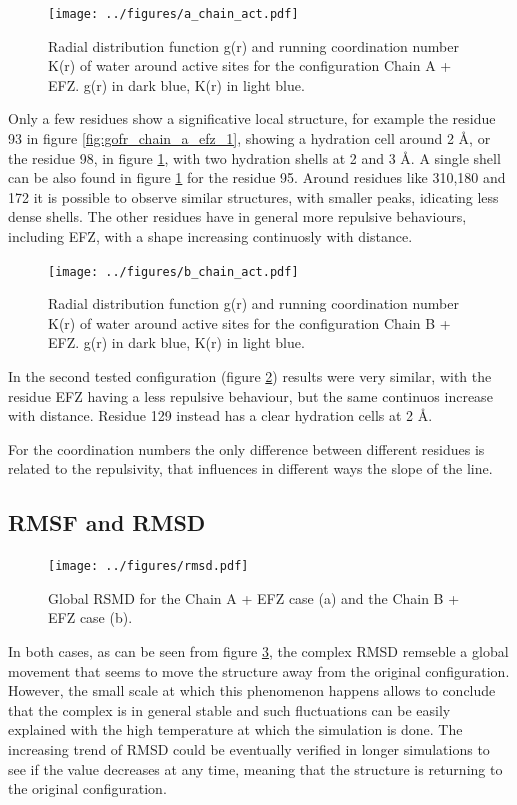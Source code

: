\documentclass[12pt]{article}
\begin{document}
\begin{figure}
    \centering
    \texttt{[image: ../figures/a\_chain\_act.pdf]}
    \caption{Radial distribution function g(r) and running coordination number K(r) of water around active sites for the configuration Chain A + EFZ. g(r) in dark blue, K(r) in light blue.\label{fig:gofr_chain_a_efz_2}}
\end{figure}
Only a few residues show a significative local structure, for example the residue 93 in figure \ref{fig:gofr_chain_a_efz_1}, showing a hydration cell around
2 \AA, or the residue 98, in figure \ref{fig:gofr_chain_a_efz_2}, with two hydration shells at 2 and 3 \AA. A single shell can be also found in figure \ref{fig:gofr_chain_a_efz_2} for the residue 95.
Around residues like 310,180 and 172 it is possible to observe similar structures, with smaller peaks, idicating less dense shells. The other residues have in general more repulsive behaviours, including EFZ, with a shape increasing continuosly with distance.

\begin{figure}[H]
    \centering
    \texttt{[image: ../figures/b\_chain\_act.pdf]}
    \caption{Radial distribution function g(r) and running coordination number K(r) of water around active sites for the configuration Chain B + EFZ. g(r) in dark blue, K(r) in light blue.\label{fig:gofr_chain_b_efz}}
\end{figure}

In the second tested configuration (figure \ref{fig:gofr_chain_b_efz}) results were very similar, with the residue EFZ having a less repulsive behaviour, but the same continuos increase with distance. Residue 129 instead has a clear hydration cells at 2 \AA.

For the coordination numbers the only difference between different residues is related to the repulsivity, that influences in different ways the slope of the line.

\subsection{RMSF and RMSD}
\begin{figure}[H]
    \centering
    \texttt{[image: ../figures/rmsd.pdf]}
    \caption{Global RSMD for the Chain A + EFZ case (a) and the Chain B + EFZ case (b).\label{fig:rmsd}}
\end{figure}
In both cases, as can be seen from figure \ref{fig:rmsd}, the complex RMSD remseble a global movement that seems to move the structure away from the original configuration. However, the small scale at which this phenomenon happens allows to conclude that the complex is in general stable and such fluctuations can be easily explained with the high temperature at which the simulation is done. The increasing trend of RMSD could be eventually verified in longer simulations to see if the value decreases at any time, meaning that the structure is returning to the original configuration.
\end{document}
